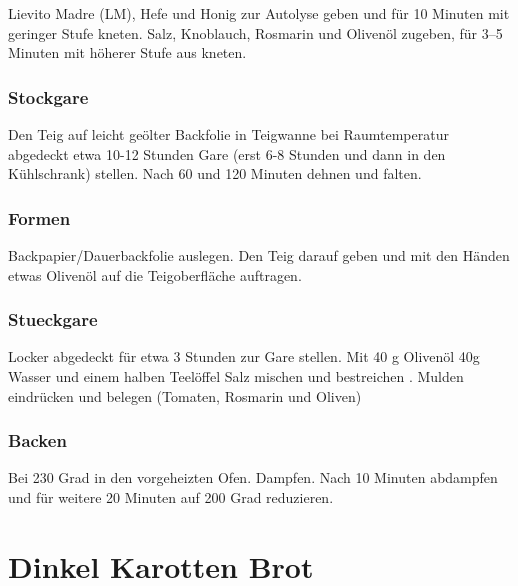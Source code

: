 Lievito Madre (LM), Hefe und Honig zur Autolyse geben und für 10 Minuten mit geringer Stufe kneten. Salz, Knoblauch, Rosmarin und Olivenöl zugeben, für 3–5 Minuten mit höherer Stufe aus kneten.



\subsubsection*{\Gls{Stockgare}}
Den Teig auf leicht geölter Backfolie in Teigwanne bei Raumtemperatur abgedeckt etwa 10-12 Stunden Gare (erst 6-8 Stunden und dann in den Kühlschrank) stellen. Nach 60 und 120 Minuten dehnen und falten.

\subsubsection*{Formen}
Backpapier/Dauerbackfolie auslegen. Den Teig darauf geben und mit den Händen etwas Olivenöl auf die Teigoberfläche auftragen. 
\subsubsection*{\Gls{Stueckgare}}
Locker abgedeckt für etwa 3 Stunden zur Gare stellen. Mit 40 g Olivenöl 40g Wasser und einem halben Teelöffel Salz mischen und bestreichen . Mulden eindrücken und belegen (Tomaten, Rosmarin und Oliven)

\subsubsection*{Backen}
Bei 230 Grad in den vorgeheizten Ofen. Dampfen. Nach 10 Minuten abdampfen und für weitere 20 Minuten auf 200 Grad reduzieren.


\section{Dinkel Karotten Brot}  

